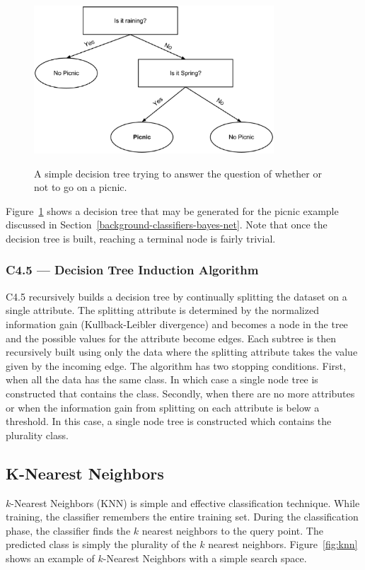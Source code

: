 \documentclass[12pt]{ucthesis}
\newcommand{\captionfonts}{\small\bf\ssp}
\begin{document}
\begin{figure}
   \begin{center}
      \includegraphics[width=0.8\textwidth]{images/Decision_Tree.eps}
      \captionfonts
      \caption[Simple Decision Tree]{A simple decision tree trying to answer the question of whether or not to go on a picnic.}
      \label{fig:decisionTree}
   \end{center}
\end{figure}

Figure~\ref{fig:decisionTree} shows a decision tree that may be generated for the picnic example discussed in Section~\ref{background-classifiers-bayes-net}.
Note that once the decision tree is built, reaching a terminal node is fairly trivial.

\subsubsection{C4.5 --- Decision Tree Induction Algorithm}
\label{background-classifiers-j48-c45}
C4.5 recursively builds a decision tree by continually splitting the dataset on a single attribute\cite{Quinlan}.
The splitting attribute is determined by the normalized information gain (Kullback-Leibler divergence) and becomes a
node in the tree and the possible values for the attribute become edges. Each subtree is then recursively built using only the
data where the splitting attribute takes the value given by the incoming edge. The algorithm has two stopping conditions.
First, when all the data has the same class. In which case a single node tree is constructed that contains the class.
Secondly, when there are no more attributes or when the information gain from splitting on each attribute is below a threshold.
In this case, a single node tree is constructed which contains the plurality class.

\subsection{K-Nearest Neighbors}
\label{background-classifiers-knn}
$k$-Nearest Neighbors (KNN) is simple and effective classification technique\cite{Duda}.
While training, the classifier remembers the entire training set.
During the classification phase, the classifier finds the $k$ nearest neighbors
to the query point. The predicted class is simply the plurality of the $k$ nearest neighbors.
Figure~\ref{fig:knn} shows an example of $k$-Nearest Neighbors with a simple search space.
\end{document}
